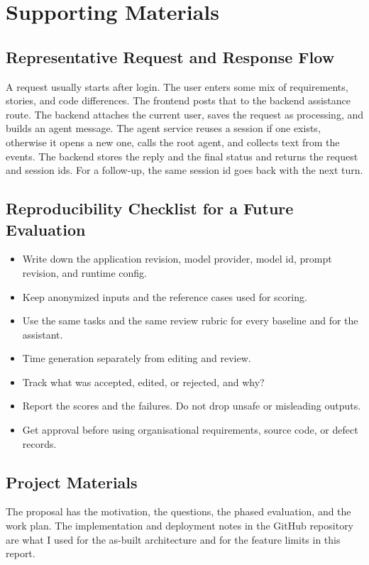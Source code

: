 \chapter{Supporting Materials}
\label{chap:appendix}

\section{Representative Request and Response Flow}
A request usually starts after login. The user enters some mix of requirements, stories, and code differences. The frontend posts that to the backend assistance route. The backend attaches the current user, saves the request as processing, and builds an agent message. The agent service reuses a session if one exists, otherwise it opens a new one, calls the root agent, and collects text from the events. The backend stores the reply and the final status and returns the request and session ids. For a follow-up, the same session id goes back with the next turn.

\section{Reproducibility Checklist for a Future Evaluation}
\begin{itemize}
  \item Write down the application revision, model provider, model id, prompt revision, and runtime config.
  \item Keep anonymized inputs and the reference cases used for scoring.
  \item Use the same tasks and the same review rubric for every baseline and for the assistant.
  \item Time generation separately from editing and review.
  \item Track what was accepted, edited, or rejected, and why?
  \item Report the scores and the failures. Do not drop unsafe or misleading outputs.
  \item Get approval before using organisational requirements, source code, or defect records.
\end{itemize}

\section{Project Materials}
The proposal has the motivation, the questions, the phased evaluation, and the work plan. The implementation and deployment notes in the GitHub repository \cite{qaapprepo} are what I used for the as-built architecture and for the feature limits in this report.
